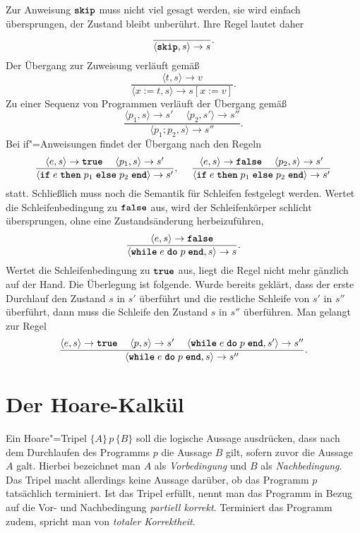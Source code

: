 Zur Anweisung $\kw{skip}$ muss nicht viel gesagt werden, sie wird einfach
übersprungen, der Zustand bleibt unberührt. Ihre Regel lautet daher
\[\dfrac{}{\langle\kw{skip},s\rangle\to s}.\]
Der Übergang zur Zuweisung verläuft gemäß
\[\dfrac{\langle t,s\rangle\to v}{\langle x:=t, s\rangle \to s[x:=v]}.\]
Zu einer Sequenz von Programmen verläuft der Übergang gemäß
\[\dfrac{\langle p_1,s\rangle\to s'\quad\;\langle p_2,s'\rangle\to s''}
{\langle p_1; p_2, s\rangle\to s''}.\]
Bei if"=Anweisungen findet der Übergang nach den Regeln
\[\dfrac{\langle e,s\rangle\to\kw{true}\quad\;\langle p_1,s\rangle\to s'}
{\langle\kw{if}\;e\;\kw{then}\;p_1\;\kw{else}\;p_2\;\kw{end}\rangle\to s'},\quad\;
\dfrac{\langle e,s\rangle\to\kw{false}\quad\;\langle p_2,s\rangle\to s'}
{\langle\kw{if}\;e\;\kw{then}\;p_1\;\kw{else}\;p_2\;\kw{end}\rangle\to s'}\]
statt. Schließlich muss noch die Semantik für Schleifen
festgelegt werden. Wertet die Schleifenbedingung zu $\kw{false}$ aus,
wird der Schleifenkörper schlicht übersprungen, ohne eine Zustandsänderung
herbeizuführen,
\[\dfrac{\langle e,s\rangle\to\kw{false}}
{\langle\kw{while}\;e\;\kw{do}\;p\;\kw{end},s\rangle\to s}.\]
Wertet die Schleifenbedingung zu $\kw{true}$ aus, liegt die Regel
nicht mehr gänzlich auf der Hand. Die Überlegung ist folgende. Wurde
bereits geklärt, dass der erste Durchlauf den Zustand $s$ in $s'$
überführt und die restliche Schleife von $s'$ in $s''$ überführt,
dann muss die Schleife den Zustand $s$ in $s''$ überführen. Man gelangt
zur Regel
\[\dfrac{\langle e,s\rangle\to\kw{true}\quad\;\langle p,s\rangle\to s'\quad\;
\langle\kw{while}\;e\;\kw{do}\;p\;\kw{end},s'\rangle\to s''}
{\langle\kw{while}\;e\;\kw{do}\;p\;\kw{end},s\rangle\to s''}.\]

\section{Der Hoare-Kalkül}

Ein Hoare"=Tripel $\{A\}\,p\,\{B\}$ soll die logische
Aussage ausdrücken, dass nach dem Durchlaufen des Programms $p$ die Aussage
$B$ gilt, sofern zuvor die Aussage $A$ galt. Hierbei bezeichnet man $A$ als
\emph{Vorbedingung} und $B$ als
\emph{Nachbedingung}. Das Tripel macht
allerdings keine Aussage darüber, ob das Programm $p$ tatsächlich
terminiert. Ist das Tripel erfüllt, nennt man das Programm in Bezug auf
die Vor- und Nachbedingung \emph{partiell korrekt}.
Terminiert das Programm zudem, spricht man von \emph{totaler Korrektheit}.%


